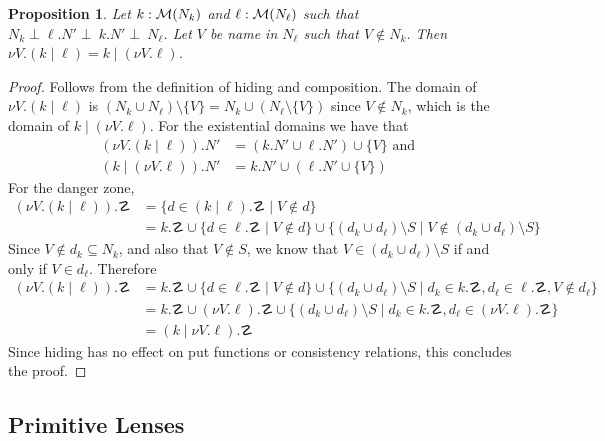 \documentclass{article}
\newtheorem{proposition}{Proposition}
\begin{document}
\begin{proposition}
    Let $k : \mathcal M(N_k)$ and $\ell : \mathcal M(N_\ell)$ such that $N_k\perp\ell.N'\perp~k.N'\perp~N_\ell$.
    Let $V$ be name in $N_\ell$ such that $V \notin N_k$.
    Then $\nu V.(k \mid \ell) = k \mid (\nu V.\ell)$.
\end{proposition}
\begin{proof}
    Follows from the definition of hiding and composition.
    The domain of $\nu V.(k \mid \ell)$ is 
    $(N_k \cup N_\ell) \setminus \{V\} = N_k \cup (N_\ell \setminus \{V\})$ 
    since $V \notin N_k$, which is the domain of $k \mid (\nu V.\ell)$. 
    For the existential domains we have that
    \begin{align*}
        (\nu V.(k \mid \ell)).N' &= (k.N' \cup \ell.N') \cup \{V\} \text{ and }\\
        (k \mid (\nu V.\ell)).N' &= k.N' \cup (\ell.N' \cup \{V\})
    \end{align*}
    For the danger zone,
    \begin{align*}
        (\nu V.(k \mid \ell)).\danger &= \{d \in (k \mid \ell).\danger \mid V \notin d \} \\
        &= k.\danger \cup \{d \in \ell.\danger \mid V \notin d \} 
        \cup \{(d_k \cup d_\ell) \setminus S \mid V \notin (d_k \cup d_\ell)\setminus S \}
    \end{align*}
    Since $V \notin d_k \subseteq N_k$, and also that $V \notin S$, we know that
    $V \in (d_k \cup d_\ell) \setminus S$ if and only if $V \in d_\ell$. Therefore
    \begin{align*}
        (\nu V.(k \mid \ell)).\danger &= k.\danger \cup \{d \in \ell.\danger \mid V \notin d \}
        \cup \{(d_k \cup d_\ell) \setminus S \mid d_k \in k.\danger, d_\ell \in \ell.\danger, V \notin d_\ell \} \\
        &= k.\danger \cup (\nu V.\ell).\danger \cup \{(d_k \cup d_\ell) \setminus S \mid
            d_k \in k.\danger, d_\ell \in (\nu V.\ell).\danger \} \\
        &= (k \mid \nu V.\ell).\danger
    \end{align*}
    Since hiding has no effect on put functions or consistency relations, 
    this concludes the proof.
\end{proof}



\subsection{Primitive Lenses}
\end{document}
